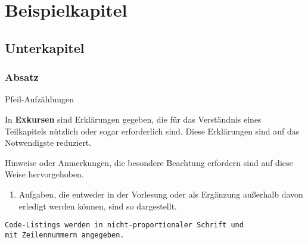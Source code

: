 
\chapter{Beispielkapitel}\label{chp:sample}
\minitoc

\section{Unterkapitel}

\subsection{Absatz}

\begin{hints}
	\item Pfeil-Aufzählungen
\end{hints}

\begin{hintbox*}
In \textbf{Exkursen} sind Erklärungen gegeben, die für das Verständnis eines Teilkapitels nützlich oder sogar erforderlich sind. Diese Erklärungen sind auf das Notwendigste reduziert.
\end{hintbox*}

\begin{hintbox}
	Hinweise oder Anmerkungen, die besondere Beachtung erfordern sind auf diese Weise hervorgehoben.
\end{hintbox}

\begin{enumerate}[label=\taskitemlabel,leftmargin=35pt]
\item Aufgaben, die entweder in der Vorlesung oder als Ergänzung außerhalb davon erledigt werden können, sind so dargestellt.
\end{enumerate}

\begin{lstlisting}
Code-Listings werden in nicht-proportionaler Schrift und 
mit Zeilennummern angegeben.
\end{lstlisting}